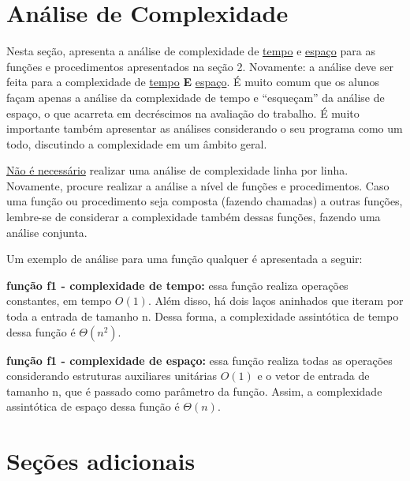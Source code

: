 \documentclass[11pt]{article}
\begin{document}

\section{Análise de Complexidade}

    \par Nesta seção, apresenta a análise de complexidade de \underline{tempo} e \underline{espaço} para as funções e procedimentos apresentados na seção 2. Novamente: a análise deve ser feita para a complexidade de \underline{tempo} \textbf{E} \underline{espaço}. É muito comum que os alunos façam apenas a análise da complexidade de tempo e “esqueçam” da análise de espaço, o que acarreta em decréscimos na avaliação do trabalho. É muito importante também apresentar as análises considerando o seu programa como um todo, discutindo a complexidade em um âmbito geral.

    \par\underline{Não é necessário} realizar uma análise de complexidade linha por linha. Novamente, procure realizar a análise a nível de funções e procedimentos. Caso uma função ou procedimento seja composta (fazendo chamadas) a outras funções, lembre-se de considerar a complexidade também dessas funções, fazendo uma análise conjunta.

    \par Um exemplo de análise para uma função qualquer  é apresentada a seguir:

    \par\textbf{função f1 - complexidade de tempo:} essa função realiza operações constantes, em tempo $O(1)$. Além disso, há dois laços aninhados que iteram por toda a entrada de tamanho n. Dessa forma, a complexidade assintótica de tempo dessa função é $\Theta(n^2)$.

    \par\textbf{função f1 - complexidade de espaço:} essa função realiza todas as operações considerando estruturas auxiliares unitárias $O(1)$ e o vetor de entrada de tamanho n, que é passado como parâmetro da função. Assim, a complexidade assintótica de espaço dessa função é $\Theta(n)$.




\section{Seções adicionais}
\end{document}
